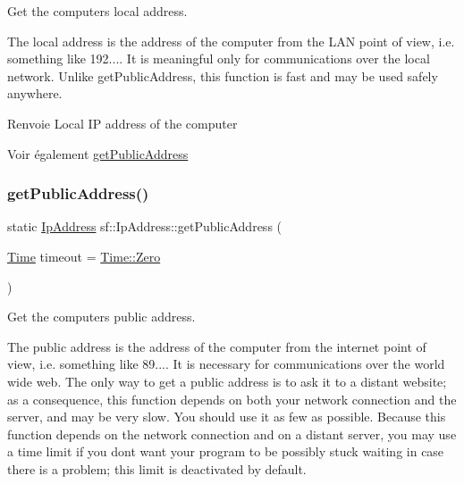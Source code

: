 Get the computer\textquotesingle{}s local address. 

The local address is the address of the computer from the L\+AN point of view, i.\+e. something like 192.... It is meaningful only for communications over the local network. Unlike get\+Public\+Address, this function is fast and may be used safely anywhere.

\begin{DoxyReturn}{Renvoie}
Local IP address of the computer
\end{DoxyReturn}
\begin{DoxySeeAlso}{Voir également}
\hyperlink{classsf_1_1IpAddress_a5c5cbf67e4aacf23c24f2ad991df4c55}{get\+Public\+Address} 
\end{DoxySeeAlso}
\mbox{\label{classsf_1_1IpAddress_a5c5cbf67e4aacf23c24f2ad991df4c55}} 
\subsubsection{\texorpdfstring{get\+Public\+Address()}{getPublicAddress()}}
{\footnotesize\ttfamily static \hyperlink{classsf_1_1IpAddress}{Ip\+Address} sf\+::\+Ip\+Address\+::get\+Public\+Address (\begin{DoxyParamCaption}\item[{\hyperlink{classsf_1_1Time}{Time}}]{timeout = {\ttfamily \hyperlink{classsf_1_1Time_a8db127b632fa8da21550e7282af11fa0}{Time\+::\+Zero}} }\end{DoxyParamCaption})\hspace{0.3cm}{\ttfamily [static]}}



Get the computer\textquotesingle{}s public address. 

The public address is the address of the computer from the internet point of view, i.\+e. something like 89.... It is necessary for communications over the world wide web. The only way to get a public address is to ask it to a distant website; as a consequence, this function depends on both your network connection and the server, and may be very slow. You should use it as few as possible. Because this function depends on the network connection and on a distant server, you may use a time limit if you don\textquotesingle{}t want your program to be possibly stuck waiting in case there is a problem; this limit is deactivated by default.


